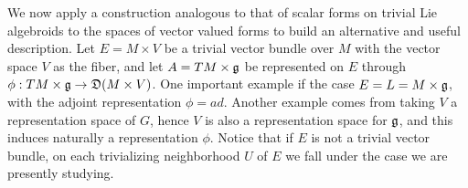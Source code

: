 



\linea


We now apply a construction analogous to that of scalar forms on trivial Lie algebroids to the spaces of vector valued forms to build an alternative and useful description. Let $E = M \times V$ be a trivial vector bundle over $M$ with the vector space $V$ as the fiber, and let $A = TM \times \mathfrak{g}$ be represented on $E$ through $\phi: TM \times \alg g \to \alg D(M \times V)$. One important example if the case $E = L = M \times \mathfrak{g}$, with the adjoint representation $\phi = ad$. Another example comes from taking $V$ a representation space of $G$, hence $V$ is also a representation space for $\mathfrak{g}$, and this induces naturally a representation $\phi$. Notice that if $E$ is not a trivial vector bundle, on each trivializing neighborhood $U$ of $E$ we fall under the case we are presently studying.

